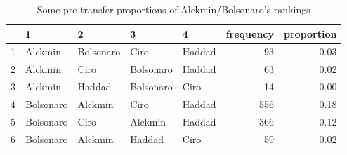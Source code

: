 \documentclass[hidelinks,11pt]{article} \usepackage[utf8]{inputenc}
\begin{document}
\begin{table}[!h] \centering %
\begin{tabular}{rllllrr} \hline & 1 & 2 & 3 & 4 & frequency & proportion \\
\hline 1 & Alckmin & Bolsonaro & Ciro & Haddad & 93 & 0.03 \\ 2 & Alckmin & Ciro
& Bolsonaro & Haddad & 63 & 0.02 \\ 3 & Alckmin & Haddad & Bolsonaro & Ciro & 14
& 0.00 \\ 4 & Bolsonaro & Alckmin & Ciro & Haddad & 556 & 0.18 \\ 5 & Bolsonaro
& Ciro & Alckmin & Haddad & 366 & 0.12 \\ 6 & Bolsonaro & Alckmin & Haddad &
Ciro & 59 & 0.02 \\ \hline
\end{tabular} %
\caption{Some pre-transfer proportions of Alckmin/Bolsonaro's rankings}
\label{tbl:overunderex}
\end{table}

\end{document}
